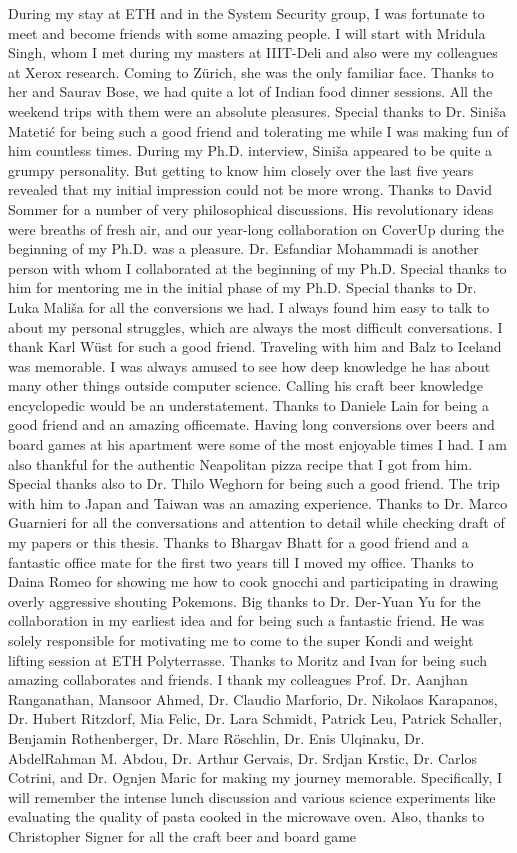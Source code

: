 During my stay at ETH and in the System Security group, I was fortunate to meet and become friends with some amazing people. I will start with Mridula Singh, whom I met during my masters at IIIT-Deli and also were my colleagues at Xerox research. Coming to Z\"urich, she was the only familiar face. Thanks to her and Saurav Bose, we had quite a lot of Indian food dinner sessions. All the weekend trips with them were an absolute pleasures. Special thanks to Dr. Sini\v{s}a Mateti\'c for being such a good friend and tolerating me while I was making fun of him countless times. During my Ph.D. interview, Sini\v{s}a appeared to be quite a grumpy personality. But getting to know him closely over the last five years revealed that my initial impression could not be more wrong. Thanks to David Sommer for a number of very philosophical discussions. His revolutionary ideas were breaths of fresh air, and our year-long collaboration on CoverUp during the beginning of my Ph.D. was a pleasure. Dr. Esfandiar Mohammadi is another person with whom I collaborated at the beginning of my Ph.D. Special thanks to him for mentoring me in the initial phase of my Ph.D. Special thanks to Dr. Luka Mali\v{s}a for all the conversions we had. I always found him easy to talk to about my personal struggles, which are always the most difficult conversations. I thank Karl W\"ust for such a good friend. Traveling with him and Balz to Iceland was memorable. I was always amused to see how deep knowledge he has about many other things outside computer science. Calling his craft beer knowledge encyclopedic would be an understatement. Thanks to Daniele Lain for being a good friend and an amazing officemate. Having long conversions over beers and board games at his apartment were some of the most enjoyable times I had. I am also thankful for the authentic Neapolitan pizza recipe that I got from him. Special thanks also to Dr. Thilo Weghorn for being such a good friend. The trip with him to Japan and Taiwan was an amazing experience. Thanks to Dr. Marco Guarnieri for all the conversations and attention to detail while checking draft of my papers or this thesis. Thanks to Bhargav Bhatt for a good friend and a fantastic office mate for the first two years till I moved my office. Thanks to Daina Romeo for showing me how to cook gnocchi and participating in drawing overly aggressive shouting Pokemons. Big thanks to Dr. Der-Yuan Yu for the collaboration in my earliest idea and for being such a fantastic friend. He was solely responsible for motivating me to come to the super Kondi and weight lifting session at ETH Polyterrasse. Thanks to Moritz and Ivan for being such amazing collaborates and friends. I thank my colleagues  Prof. Dr. Aanjhan Ranganathan, Mansoor Ahmed, Dr. Claudio Marforio, Dr. Nikolaos Karapanos, Dr. Hubert Ritzdorf, Mia Felic, Dr. Lara Schmidt, Patrick Leu, Patrick Schaller, Benjamin Rothenberger, Dr. Marc R\"oschlin, Dr. Enis Ulqinaku, Dr. AbdelRahman M. Abdou, Dr. Arthur Gervais, Dr. Srdjan Krstic, Dr. Carlos Cotrini, and Dr. Ognjen Maric for making my journey memorable. Specifically, I will remember the intense lunch discussion and various science experiments like evaluating the quality of pasta cooked in the microwave oven. Also, thanks to Christopher Signer for all the craft beer and board game 